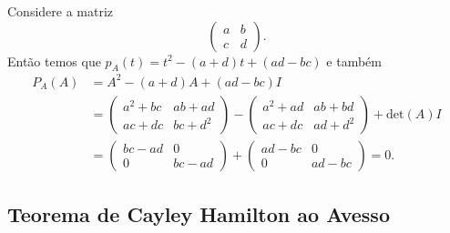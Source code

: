 \documentclass[11pt,twoside,a4paper]{book}
\begin{document}
\begin{exemplo}
Considere a matriz\[\begin{pmatrix}
a & b \\ c & d
\end{pmatrix}.\]
Então temos que \(p_A(t)=t^2-(a+d)t+(ad-bc)\) e também
\begin{align*}
P_A(A)&=A^2-(a+d)A+(ad-bc)I\\
&=
\begin{pmatrix} a^2+bc & ab+ad\\ac+dc & bc+d^2\end{pmatrix}
-\begin{pmatrix} a^2+ad & ab+bd \\ ac+dc & ad+d^2\end{pmatrix}
+ \text{det}(A)I
\\&=\begin{pmatrix}bc-ad & 0 \\ 0 & bc- ad\end{pmatrix}
+ \begin{pmatrix}ad-bc & 0 \\ 0 & ad - bc\end{pmatrix} = 0.
\end{align*}
\end{exemplo}

\subsection{Teorema de Cayley Hamilton ao Avesso}
\end{document}
